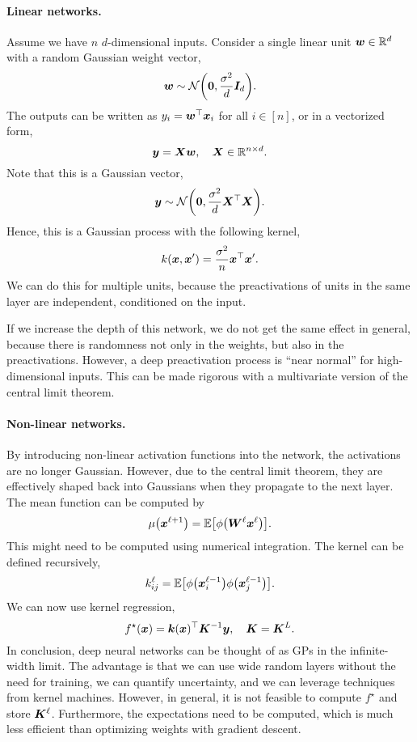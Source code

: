 \paragraph{Linear networks.}

Assume we have $n$ $d$-dimensional inputs. Consider a single linear unit $\bm{w} \in \mathbb{R}^d$ with a
random Gaussian weight vector, \[
    \vec{w} \sim \mathcal{N}\lft( \vec{0}, \frac{\sigma^2}{d} \mat{I}_d \rgt).
\]
The outputs can be written as $y_i = \bm{w}^\top \bm{x}_i$ for all $i \in [n]$, or in a
vectorized form, \[
    \bm{y} = \bm{X} \bm{w}, \quad \bm{X} \in \mathbb{R}^{n \times d}.
\]
Note that this is a Gaussian vector, \[
    \vec{y} \sim \mathcal{N}\lft( \vec{0}, \frac{\sigma^2}{d} \transpose{\mat{X}} \mat{X} \rgt).
\]
Hence, this is a Gaussian process with the following kernel, \[
    k(\bm{x}, \bm{x}') = \frac{\sigma^2}{n} \bm{x}^\top\bm{x}'.
\]
We can do this for multiple units, because the preactivations of units in the same layer are
independent, conditioned on the input.

If we increase the depth of this network, we do not get the same effect in general, because there
is randomness not only in the weights, but also in the preactivations. However, a deep
preactivation process is ``near normal'' for high-dimensional inputs. This can be made rigorous
with a multivariate version of the central limit theorem.

\paragraph{Non-linear networks.}

By introducing non-linear activation functions into the network, the activations are no longer
Gaussian. However, due to the central limit theorem, they are effectively shaped back into
Gaussians when they propagate to the next layer. The mean function can be computed by \[
    \mu \lft( \vec{x}^{\ell+1} \rgt) = \E \lft[ \phi \lft( \mat{W}^{\ell} \vec{x}^\ell \rgt) \rgt].
\]
This might need to be computed using numerical integration. The kernel can be defined recursively, \[
    k^{\ell}_{ij} = \E \lft[ \phi\lft( \vec{x}_{i}^{\ell-1} \rgt) \phi\lft( \vec{x}_j^{\ell-1} \rgt) \rgt].
\]
We can now use kernel regression, \[
    f^\star(\bm{x}) = \bm{k}(\bm{x})^\top \bm{K}^{-1} \bm{y}, \quad \bm{K} = \bm{K}^{L}.
\]
In conclusion, deep neural networks can be thought of as GPs in the infinite-width
limit. The advantage is that we can use wide random layers without the need for training, we
can quantify uncertainty, and we can leverage techniques from kernel machines. However, in general,
it is not feasible to compute $f^\star$ and store $\bm{K}^{\ell}$. Furthermore, the expectations
need to be computed, which is much less efficient than optimizing weights with gradient descent.
